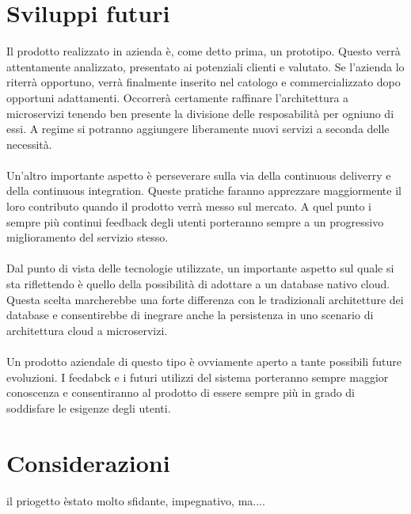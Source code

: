 \section{Sviluppi futuri}
Il prodotto realizzato in azienda è, come detto prima, un prototipo. Questo verrà attentamente analizzato, presentato ai potenziali clienti e valutato. Se l'azienda lo riterrà opportuno, verrà finalmente inserito nel catologo e commercializzato dopo opportuni adattamenti. Occorrerà certamente raffinare l'architettura a microservizi tenendo ben presente la divisione delle resposabilità per ogniuno di essi. A regime si potranno aggiungere liberamente nuovi servizi a seconda delle necessità.
\paragraph{}
Un'altro importante aspetto è perseverare sulla via della continuous deliverry e della continuous integration. Queste pratiche faranno apprezzare maggiormente il loro contributo quando il prodotto verrà messo sul mercato. A quel punto i sempre più continui feedback degli utenti porteranno sempre a un progressivo miglioramento del servizio stesso.
\paragraph{}
Dal punto di vista delle tecnologie utilizzate, un importante aspetto sul quale si sta riflettendo è quello della possibilità di adottare a un database nativo cloud. Questa scelta marcherebbe una forte differenza con le tradizionali architetture dei database e consentirebbe di inegrare anche la persistenza in uno scenario di architettura cloud a microservizi.
\paragraph{}
Un prodotto aziendale di questo tipo è ovviamente aperto a tante possibili future evoluzioni. I feedabck e i futuri utilizzi del sistema porteranno sempre maggior conoscenza e consentiranno al prodotto di essere sempre più in grado di soddisfare le esigenze degli utenti.

\section{Considerazioni}

il priogetto èstato molto sfidante, impegnativo, ma....
